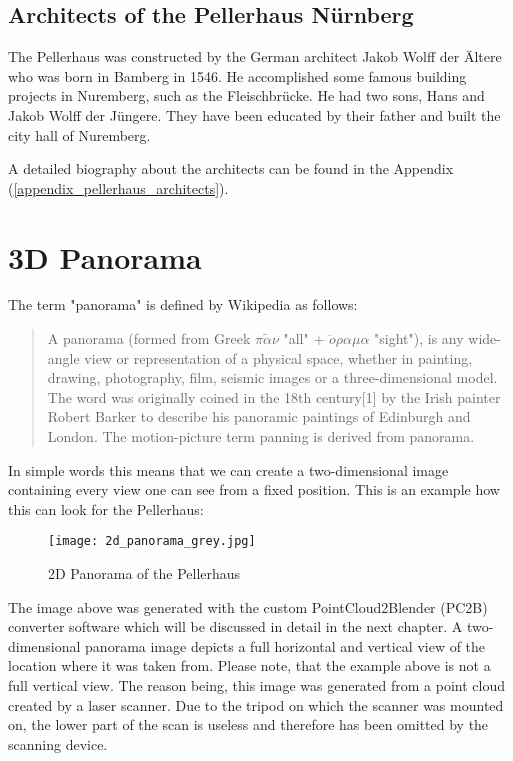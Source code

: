 \subsection{Architects of the Pellerhaus Nürnberg}

The Pellerhaus was constructed by the German architect Jakob Wolff der Ältere who was born in Bamberg in 1546. He accomplished some famous building projects in Nuremberg, such as the Fleischbrücke. He had two sons, Hans and Jakob Wolff der Jüngere. They have been educated by their father and built the city hall of Nuremberg.

A detailed biography about the architects can be found in the Appendix (\ref{appendix_pellerhaus_architects}).

\section{3D Panorama}

The term "panorama" is defined by Wikipedia \parencite{wiki:Panorama} as follows:


\blockquote{
	A panorama (formed from Greek {$\pi\tilde{\alpha}\nu $} "all" + {$\ddot{o}\rho\alpha\mu\alpha$} "sight"), is any wide-angle view or representation of a physical space, whether in painting, drawing, photography, film, seismic images or a three-dimensional model. The word was originally coined in the 18th century[1] by the Irish painter Robert Barker to describe his panoramic paintings of Edinburgh and London. The motion-picture term panning is derived from panorama.
}

In simple words this means that we can create a two-dimensional image containing every view one can see from a fixed position. This is an example how this can look for the Pellerhaus:

\begin{figure}[h]
	\centering
	\texttt{[image: 2d\_panorama\_grey.jpg]}
	\caption{2D Panorama of the Pellerhaus}
	\label{fig:2d_panorama}
\end{figure}

The image above was generated with the custom PointCloud2Blender (PC2B) converter software which will be discussed in detail in the next chapter. A two-dimensional panorama image depicts a full horizontal and vertical view of the location where it was taken from. Please note, that the example above is not a full vertical view. The reason being, this image was generated from a point cloud created by a laser scanner. Due to the tripod on which the scanner was mounted on, the lower part of the scan is useless and therefore has been omitted by the scanning device.


